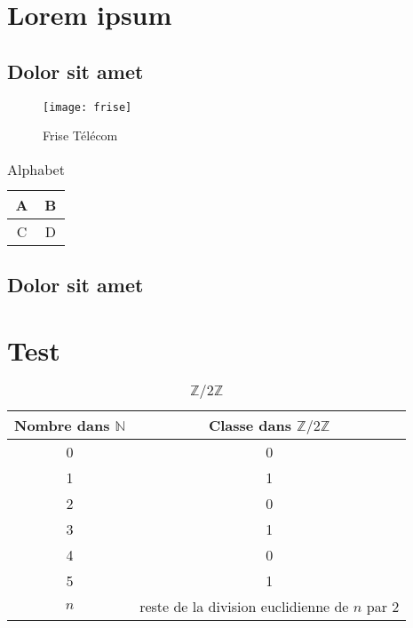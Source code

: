 \section{Lorem ipsum}
\subsection{Dolor sit amet}

\begin{figure}[h]
	\centering
	\texttt{[image: frise]}
	\caption{Frise Télécom}
\end{figure}

\lipsum[1]

\begin{table}[h]
	\centering
	\begin{tabular}{|c|c|}
	\hline A & B \\
	\hline C & D \\
	\hline
	\end{tabular}
	\caption{Alphabet}
\end{table}

\subsection{Dolor sit amet}
\lipsum[1-3]




\appendix
{}
\section{Test}
\begin{table}[h]
	\centering
	\begin{tabular}{|c | c|}
		\hline \textbf{Nombre dans $\mathbb{N}$} & \textbf{Classe dans $\mathbb{Z}/2\mathbb{Z}$} \\
		\hline 0 & 0 \\
	        \hline 1 & 1 \\
		\hline 2 & 0 \\
		\hline 3 & 1 \\
		\hline 4 & 0 \\
		\hline 5 & 1 \\
		\hline $n$ & reste de la division euclidienne de $n$ par 2 \\
		\hline
	\end{tabular}
	\caption{$\mathbb{Z}/2\mathbb{Z}$}
\end{table}
\newpage
{}
